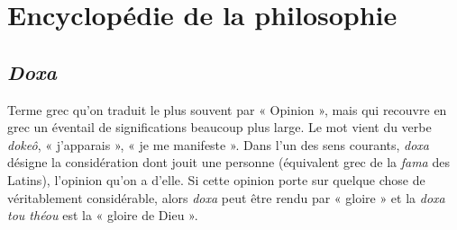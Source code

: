 
\section{Encyclopédie de la philosophie}

\subsection{{\it Doxa}}

Terme grec qu’on traduit le plus souvent
par « Opinion », mais qui recouvre en
grec un éventail de significations beaucoup
plus large. Le mot vient du verbe
{\it dokeô}, « j’apparais », « je me manifeste ».
Dans l’un des sens courants, {\it doxa} désigne
la considération dont jouit une personne
(équivalent grec de la {\it fama} des Latins),
l’opinion qu’on a d’elle. Si cette opinion
porte sur quelque chose de véritablement
considérable, alors {\it doxa} peut être rendu
par « gloire » et la {\it doxa tou théou} est la
« gloire de Dieu ».

 
